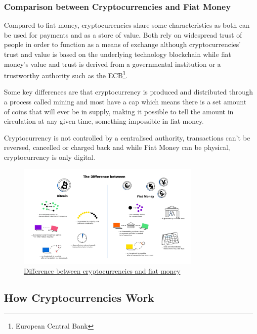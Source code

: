 \documentclass{article}
\newcommand\tab[1][1cm]{\hspace*{#1}}
\begin{document}
\subsubsection{Comparison between Cryptocurrencies and Fiat Money}

\tab Compared to fiat money, cryptocurrencies share some characteristics as both can be used for payments and as a store of value. Both rely on widespread trust of people in order to function as a means of exchange although cryptocurrencies' trust and value is based on the underlying technology blockchain while fiat money's value and trust is derived from a governmental institution or a trustworthy authority such as the ECB\footnote{European Central Bank}.

Some key differences are that cryptocurrency is  produced and distributed through a process called mining and most have a cap which means there is a set amount of coins that will ever be in supply, making it possible to tell the amount in circulation at any given time, something impossible in fiat money.
 
Cryptocurrency is not controlled by a centralised authority, transactions can’t be reversed, cancelled or charged back and while Fiat Money can be physical, cryptocurrency is only digital.

\begin{figure}[H]
    \begin{center}
        \includegraphics[width=0.8\textwidth]{images/cryptocurrencies_vs_fiat_money.jpeg}
        \caption{\href{https://bitpanda-academy.imgix.net/null94a7b99f-2399-48fa-a503-876e2ba6f2bf/Bitpanda-Infographics_2-bitcoin_fiat.png?auto=compress\%2Cformat&fit=min&fm=jpg&q=80&w=2100}{\underline{Difference between cryptocurrencies and fiat money}}}
    \end{center}
\end{figure}

\subsection{How Cryptocurrencies Work}
\end{document}
